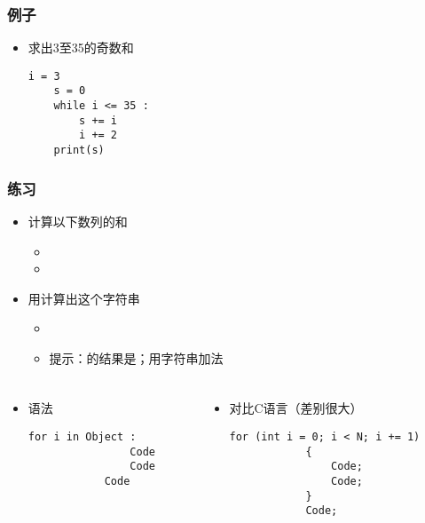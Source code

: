 \begin{CJK}{UTF8}{gbsn}
\begin{frame} [fragile]
	\frametitle{例子}
	\linespread{1.25}
	\begin{itemize}
	\item 求出3至35的奇数和
	\begin{lstlisting}[style=pythonstyle, gobble=4, texcl]
	i = 3
	s = 0
	while i <= 35 :
		s += i
		i += 2
	print(s)
	\end{lstlisting}
	\end{itemize}
\end{frame}

\begin{frame} [fragile]
	\frametitle{练习}
	\linespread{1.5}
	\begin{itemize}
	\item 计算以下数列的和
		\begin{itemize}
		\item {}
		\item {}
		\end{itemize}
	\item 用计算出这个字符串
		\begin{itemize}
		\item {}
		\item 提示：的结果是；用字符串加法
		\end{itemize}
	\end{itemize}
\end{frame}

\begin{frame} [fragile]
	\frametitle{}
	\linespread{1.5}
	\begin{columns}[T]
		\begin{column}[T]{.5\textwidth}
			\begin{itemize}
			\item 语法
			\begin{lstlisting}[style=pythonstyle, gobble=12]
			for i in Object :
				Code
				Code
			Code
			\end{lstlisting}
			\end{itemize}
		\end{column}
		\begin{column}[T]{.5\textwidth}
			\begin{itemize}
			\item 对比C语言（差别很大）
			\begin{lstlisting}[style=cstyle, gobble=12]
			for (int i = 0; i < N; i += 1)
			{
				Code;
				Code;
			}
			Code;
			\end{lstlisting}
			\end{itemize}
		\end{column}
	\end{columns}
\end{frame}


\end{CJK}
